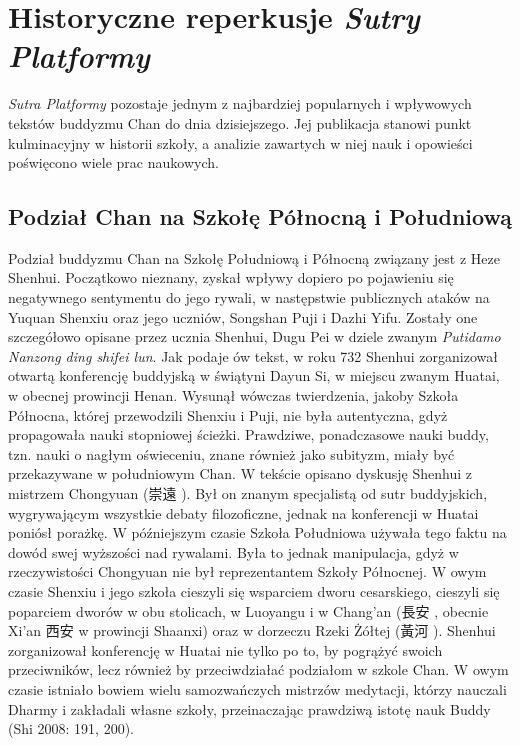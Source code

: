 \chapter{Historyczne reperkusje \textit{Sutry Platformy}}
\label{ch:chapter_four}
\textit{Sutra Platformy} pozostaje jednym z najbardziej popularnych i wpływowych tekstów buddyzmu Chan do dnia dzisiejszego. Jej publikacja stanowi punkt kulminacyjny w historii szkoły, a analizie zawartych w niej nauk i opowieści poświęcono wiele prac naukowych.

\section{Podział Chan na Szkołę Północną i Południową}
Podział buddyzmu Chan na Szkołę Południową i Północną związany jest z Heze Shenhui.
Początkowo nieznany, zyskał wpływy dopiero po pojawieniu się negatywnego sentymentu do jego rywali, w następstwie publicznych ataków na Yuquan Shenxiu oraz jego uczniów, Songshan Puji i Dazhi Yifu.
Zostały one szczegółowo opisane przez ucznia Shenhui, Dugu Pei w dziele zwanym \textit{Putidamo Nanzong ding shifei lun}. %
Jak podaje ów tekst, w roku 732 Shenhui zorganizował otwartą konferencję buddyjską w świątyni Dayun Si, w miejscu zwanym Huatai, w obecnej prowincji Henan.\label{Huatai}
Wysunął wówczas twierdzenia, jakoby Szkoła Północna, której przewodzili Shenxiu i Puji, nie była autentyczna, gdyż propagowała nauki stopniowej ścieżki.
Prawdziwe, ponadczasowe nauki buddy, tzn. nauki o nagłym oświeceniu, znane również jako subityzm, miały być przekazywane w południowym Chan.
W tekście opisano dyskusję Shenhui z mistrzem Chongyuan (崇遠 ).
Był on znanym specjalistą od sutr buddyjskich, wygrywającym wszystkie debaty filozoficzne, jednak na konferencji w Huatai poniósł porażkę.
W późniejszym czasie Szkoła Południowa używała tego faktu na dowód swej wyższości nad rywalami.
Była to jednak manipulacja, gdyż w rzeczywistości Chongyuan nie był reprezentantem Szkoły Północnej.
W owym czasie Shenxiu i jego szkoła cieszyli się wsparciem dworu cesarskiego, cieszyli się poparciem dworów w obu stolicach, w Luoyangu i w Chang'an (長安 , obecnie Xi'an 西安  w prowincji Shaanxi) oraz w dorzeczu Rzeki Żółtej (黃河 ).
Shenhui zorganizował konferencję w Huatai nie tylko po to, by pogrążyć swoich przeciwników, lecz również by przeciwdziałać podziałom w szkole Chan.
W owym czasie istniało bowiem wielu samozwańczych mistrzów medytacji, którzy nauczali Dharmy i zakładali własne szkoły, przeinaczając prawdziwą istotę nauk Buddy
(Shi 2008: 191, 200).

